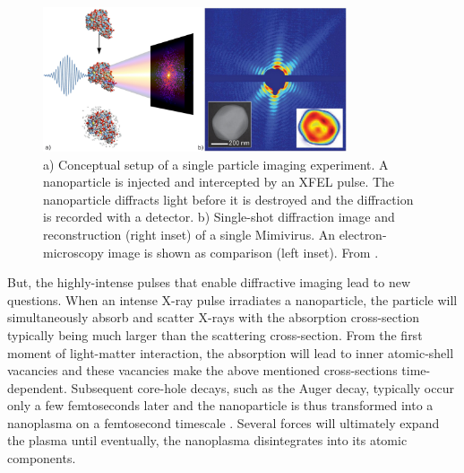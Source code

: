 \begin{figure}
	\centering
		\includegraphics[width=0.80\textwidth]{images/intro-dani.jpg}
	\caption[Conceptual setup of a single particle imaging experiment.]{a) Conceptual setup of a single particle imaging experiment. A nanoparticle is injected and intercepted by an XFEL pulse. The nanoparticle diffracts light before it is destroyed and the diffraction is recorded with a detector. b) Single-shot diffraction image and reconstruction (right inset) of a single Mimivirus. An electron-microscopy image is shown as comparison (left inset). From \cite{Rupp-2013-Thesis,Neutze-2000-Nature,Seibert-2011-Nature}.}
	\label{fig:spi-concept}
\end{figure}
%
But, the highly-intense pulses that enable diffractive imaging lead to new questions. When an intense X-ray pulse irradiates a nanoparticle, the particle will simultaneously absorb and scatter X-rays with the absorption cross-section typically being much larger than the scattering cross-section. From the first moment of light-matter interaction, the absorption will lead to inner atomic-shell vacancies \citep{Young-2010-Nature} and these vacancies make the above mentioned cross-sections time-dependent. Subsequent core-hole decays, such as the Auger decay, typically occur only a few femtoseconds later and the nanoparticle is thus transformed into a nanoplasma on a femtosecond timescale \cite{Bostedt-2012-PRL}. Several forces will ultimately expand the plasma \citep{Gorkhover-2016-NatPho,Ferguson-2016-SciAdv} until eventually, the nanoplasma disintegrates into its atomic components.\\[1\baselineskip]
%
